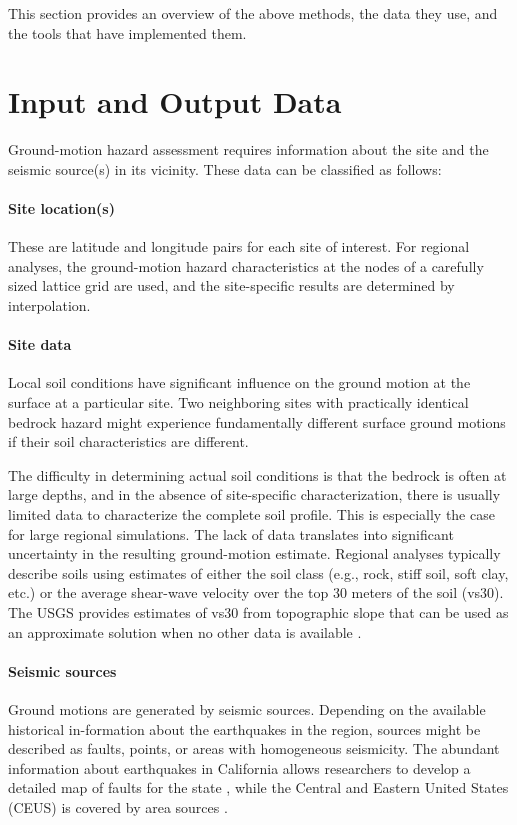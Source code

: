 This section provides an overview of the above methods, the data they use, and the tools that have implemented them.

\section{Input and Output Data}
\label{sec:eq_shake_io}

Ground-motion hazard assessment requires information about the site and the seismic source(s) in its vicinity. These data can be classified as follows:

\paragraph{Site location(s)} These are latitude and longitude pairs for each site of interest. For regional analyses, the ground-motion hazard characteristics at the nodes of a carefully sized lattice grid are used, and the site-specific results are determined by interpolation.

\paragraph{Site data} Local soil conditions have significant influence on the ground motion at the surface at a particular site. Two neighboring sites with practically identical bedrock hazard might experience fundamentally different surface ground motions if their soil characteristics are different. 

The difficulty in determining actual soil conditions is that the bedrock is often at large depths, and in the absence of site-specific characterization, there is usually limited data to characterize the complete soil profile. This is especially the case for large regional simulations. The lack of data translates into significant uncertainty in the resulting ground-motion estimate. Regional analyses typically describe soils using estimates of either the soil class (e.g., rock, stiff soil, soft clay, etc.) or the average shear-wave velocity over the top 30 meters of the soil (vs30). The USGS provides estimates of vs30 from topographic slope that can be used as an approximate solution when no other data is available \citep{usgs2020vs30}. 

\paragraph{Seismic sources} Ground motions are generated by seismic sources. Depending on the available historical in-formation about the earthquakes in the region, sources might be described as faults, points, or areas with homogeneous seismicity. The abundant information about earthquakes in California allows researchers to develop a detailed map of faults for the state \citep{field2014uniform}, while the Central and Eastern United States (CEUS) is covered by area sources \citep{mueller2015seismic}.

